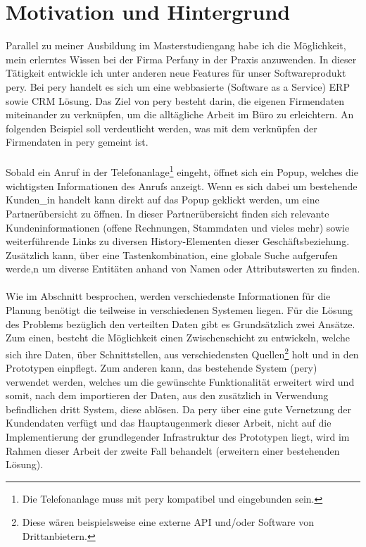 \documentclass[Bachelorarbeit.tex]{subfiles}
\begin{document}
\section{Motivation und Hintergrund}
\label{chap:einfuehrung:sec:hintergrund}
Parallel zu meiner Ausbildung im Masterstudiengang habe ich die Möglichkeit, mein erlerntes Wissen bei der Firma Perfany in der Praxis anzuwenden.
In dieser Tätigkeit entwickle ich unter anderen neue Features für unser Softwareprodukt pery.
Bei pery handelt es sich um eine webbasierte (Software as a Service) \ac{ERP} sowie \ac{CRM} Lösung.
Das Ziel von pery besteht darin, die eigenen Firmendaten miteinander zu verknüpfen, um die alltägliche Arbeit im Büro zu erleichtern.
An folgenden Beispiel soll verdeutlicht werden, was mit dem verknüpfen der Firmendaten in pery gemeint ist.\\
\\
Sobald ein Anruf in der Telefonanlage\footnote{Die Telefonanlage muss mit pery kompatibel und eingebunden sein.} eingeht, öffnet sich ein Popup, welches die wichtigsten Informationen des Anrufs anzeigt. 
Wenn es sich dabei um bestehende Kunden\_in handelt kann direkt auf das Popup geklickt werden, um eine Partnerübersicht zu öffnen.
In dieser Partnerübersicht finden sich relevante Kundeninformationen (offene Rechnungen, Stammdaten und vieles mehr) sowie weiterführende Links zu diversen History-Elementen dieser Geschäftsbeziehung.
Zusätzlich kann, über eine Tastenkombination, eine globale Suche aufgerufen werde,n um diverse Entitäten anhand von Namen oder Attributswerten zu finden. \\
\\
Wie im Abschnitt  besprochen, werden verschiedenste Informationen für die Planung benötigt die teilweise in verschiedenen Systemen liegen. 
Für die Lösung des Problems bezüglich den verteilten Daten gibt es Grundsätzlich zwei Ansätze.
Zum einen, besteht die Möglichkeit einen Zwischenschicht zu entwickeln, welche sich ihre Daten, über Schnittstellen, aus verschiedensten Quellen\footnote{Diese wären beispielsweise eine externe \ac{API} und/oder Software von Drittanbietern.} holt und in den Prototypen einpflegt.
Zum anderen kann, das bestehende System (pery) verwendet werden, welches um die gewünschte Funktionalität erweitert wird und somit, nach dem importieren der Daten, aus den zusätzlich in Verwendung befindlichen dritt System, diese ablösen. 
Da pery über eine gute Vernetzung der Kundendaten verfügt und das Hauptaugenmerk dieser Arbeit, nicht auf die Implementierung der grundlegender Infrastruktur des Prototypen liegt, wird im Rahmen dieser Arbeit der zweite Fall behandelt (erweitern einer bestehenden Lösung).
\end{document}
